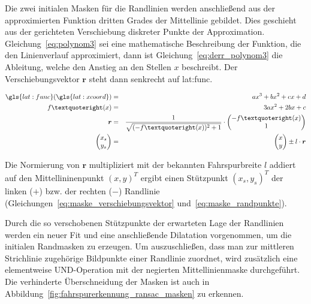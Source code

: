 Die zwei initialen Masken für die Randlinien werden anschließend aus der approximierten Funktion dritten Grades der Mittellinie gebildet. Dies geschieht aus der gerichteten Verschiebung diskreter Punkte der Approximation. Gleichung~\ref{eq:polynom3} sei eine mathematische Beschreibung der Funktion, die den Linienverlauf approximiert, dann ist Gleichung~\ref{eq:derr_polynom3} die Ableitung, welche den Anstieg an den Stellen \( x \) beschreibt. Der Verschiebungsvektor \( \boldsymbol{r} \) steht dann senkrecht auf \gls{lat:func}.

\begin{eqnarray}
\gls{lat:func}(\gls{lat:xcoord}) & = & ax^3 + bx^2 +cx +d  \label{eq:polynom3} 	\\
f’(x) & = & 3ax^2 + 2bx +c \label{eq:derr_polynom3} 							\\
\boldsymbol{r} & = & \frac{1}{\sqrt{(-f’(x))^2 + 1}} \cdot
\begin{pmatrix}
-f’(x) 	\\
1 		\\
\end{pmatrix}
\label{eq:maske_verschiebungsvektor}									\\
\begin{pmatrix}
x_s 	\\
y_s	\\
\end{pmatrix}
 & = & 
 \begin{pmatrix}
x 	\\
y	\\
\end{pmatrix}
\pm l \cdot \boldsymbol{r}  
\label{eq:maske_randpunkte}
\end{eqnarray}

Die Normierung von \( \boldsymbol{r} \) multipliziert mit der bekannten Fahrspurbreite \( l \) addiert auf den Mittellininenpunkt \( (x,y)^T \) ergibt einen Stützpunkt \( (x_s,y_s)^T \) der linken (\( + \)) bzw. der rechten (\( - \)) Randlinie (Gleichungen~\ref{eq:maske_verschiebungsvektor} und~\ref{eq:maske_randpunkte}).

Durch die so verschobenen Stützpunkte der erwarteten Lage der Randlinien werden ein neuer Fit und eine anschließende Dilatation vorgenommen, um die initialen Randmasken zu erzeugen. Um auszuschließen, dass man zur mittleren Strichlinie zugehörige Bildpunkte einer Randlinie zuordnet, wird zusätzlich eine elementweise UND-Operation mit der negierten Mittellinienmaske durchgeführt. Die verhinderte Überschneidung der Masken ist auch in Abbildung~\ref{fig:fahrspurerkennung_ransac_masken} zu erkennen.

